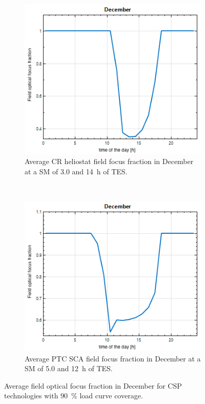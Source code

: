 \begin{figure}[!htbp]
        \centering                
        \begin{subfigure}[b]{0.5\textwidth}
                \centering
                \includegraphics[width=1\textwidth]{FIG/FocusFraction/DecemberCR}
                \caption{Average CR heliostat field focus fraction in December at a SM of 3.0 and 14~h of TES.}\label{DecemberCR}
        \end{subfigure}%
        ~
        \begin{subfigure}[b]{0.5\textwidth}
                \centering
                \includegraphics[width=1\textwidth]{FIG/FocusFraction/DecemberPTC}
                \caption{Average PTC SCA field focus fraction in December at a SM of 5.0 and 12~h of TES.}\label{DecemberPTC}
        \end{subfigure}
        \caption{Average field optical focus fraction in December for CSP technologies with \SI{90}{\percent} load curve coverage.}\label{FocusFraction}
\end{figure}

